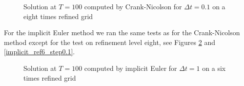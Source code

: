 \documentclass[a4paper, 11pt, twoside]{article}
\begin{document}
\begin{figure}[htbp]
\begin{center}
\caption{Solution at $T = 100$ computed by Crank-Nicolson for $\Delta t = 0.1$ on a eight times refined grid}
\label{crank_ref8_step0.1}
\end{center}
\end{figure}

For the implicit Euler method we ran the same tests as for the Crank-Nicolson method except for the test on refinement level eight, see Figures \ref{implicit_ref6_step1} and \ref{implicit_ref6_step0.1}.

\begin{figure}[htbp]
\begin{center}
\caption{Solution at $T = 100$ computed by implicit Euler for $\Delta t = 1$ on a six times refined grid}
\label{implicit_ref6_step1}
\end{center}
\end{figure}
\end{document}
